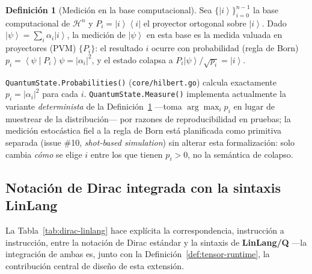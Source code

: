 \documentclass[12pt, a4paper, openany]{report}
\theoremstyle{definition}
\newtheorem{definition}{Definición}[chapter]
\newcommand{\linlangQ}{\textbf{LinLang/Q}}
\newcommand{\ket}[1]{\left|#1\right\rangle}
\newcommand{\bra}[1]{\left\langle#1\right|}
\newcommand{\braketnotation}[2]{\left\langle#1\middle|#2\right\rangle}
\begin{document}
\begin{definition}[Medición en la base computacional]
\label{def:medicion-proyeccion}
Sea $\{\ket{i}\}_{i=0}^{n-1}$ la base computacional de $\mathcal{H}^n$ y $P_i = \ket{i}\bra{i}$ el proyector ortogonal sobre $\ket{i}$. Dado $\ket{\psi} = \sum_i \alpha_i \ket{i}$, la medición de $\ket{\psi}$ en esta base es la medida valuada en proyectores (PVM) $\{P_i\}$: el resultado $i$ ocurre con probabilidad (regla de Born) $p_i = \braketnotation{\psi}{P_i}{\psi} = |\alpha_i|^2$, y el estado colapsa a $P_i\ket{\psi}/\sqrt{p_i} = \ket{i}$.
\end{definition}

\texttt{QuantumState.Probabilities()} (\texttt{core/hilbert.go}) calcula exactamente $p_i = |\alpha_i|^2$ para cada $i$. \texttt{QuantumState.Measure()} implementa actualmente la variante \emph{determinista} de la Definición~\ref{def:medicion-proyeccion} —toma $\arg\max_i p_i$ en lugar de muestrear de la distribución— por razones de reproducibilidad en pruebas; la medición estocástica fiel a la regla de Born está planificada como primitiva separada (issue \#10, \emph{shot-based simulation}) sin alterar esta formalización: solo cambia \emph{cómo} se elige $i$ entre los que tienen $p_i>0$, no la semántica de colapso.

\subsection{Notación de Dirac integrada con la sintaxis LinLang}

La Tabla~\ref{tab:dirac-linlang} hace explícita la correspondencia, instrucción a instrucción, entre la notación de Dirac estándar y la sintaxis de \linlangQ{} —la integración de ambas es, junto con la Definición~\ref{def:tensor-runtime}, la contribución central de diseño de esta extensión.
\end{document}
